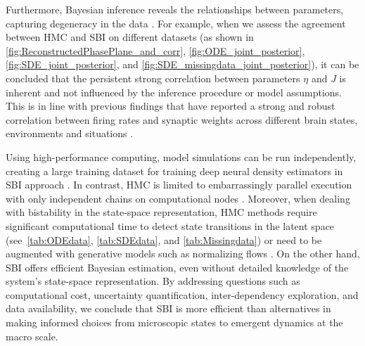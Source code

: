 \documentclass[preprint,11pt,authoryear]{elsarticle}
\begin{document}
Furthermore, Bayesian inference reveals the relationships between parameters, capturing degeneracy in the data \citep{Edelman2001, Hashemi2023}. For example, when we assess the agreement between HMC and SBI on different datasets (as shown in \autoref{fig:ReconstructedPhasePlane_and_corr}, \autoref{fig:ODE_joint_posterior}, \autoref{fig:SDE_joint_posterior}, and \autoref{fig:SDE_missingdata_joint_posterior}), it can be concluded that the persistent strong correlation between parameters $\eta$ and $J$ is inherent and not influenced by the inference procedure or model assumptions. This is in line with previous findings that have reported a strong and robust correlation between firing rates and synaptic weights across different brain states, environments and situations \citep{Buzsaki2014}. 


Using high-performance computing, model simulations can be run independently, creating a large training dataset for training deep neural density estimators in SBI approach \citep{Hashemi2023}. In contrast, HMC is limited to embarrassingly parallel execution with only independent chains on computational nodes \citep{Hashemi2021}. Moreover, when dealing with bistability in the state-space representation, HMC methods require significant computational time to detect state transitions in the latent space (see~\autoref{tab:ODEdata}, \autoref{tab:SDEdata}, and \autoref{tab:Missingdata}) or need to be augmented with generative models such as normalizing flows \citep{Hoffman2019, Gabrie2022}. On the other hand, SBI offers efficient Bayesian estimation, even without detailed knowledge of the system's state-space representation. By addressing questions such as computational cost, uncertainty quantification, inter-dependency exploration, and data availability, we conclude that SBI is more efficient than alternatives in making informed choices from microscopic states to emergent dynamics at the macro scale. 
\end{document}
